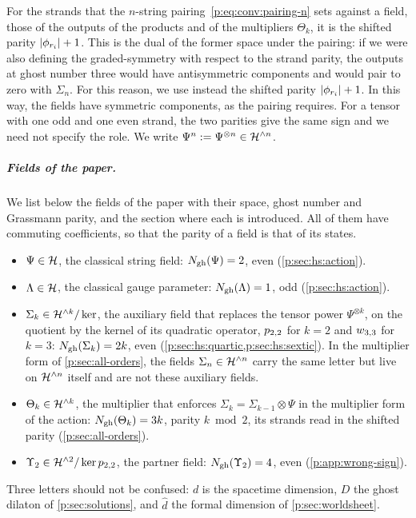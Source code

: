 For the strands that the $n$-string pairing~\eqref{p:eq:conv:pairing-n} sets against a field, those of the outputs of the products and of the multipliers $\Theta_k$, it is the shifted parity ${|\phi_{r_i}|} + 1$.
This is the dual of the former space under the pairing: if we were also defining the graded-symmetry with respect to the strand parity, the outputs at ghost number three would have antisymmetric components and would pair to zero with $\Sigma_n$.
For this reason, we use instead the shifted parity ${|\phi_{r_i}|} + 1$.
In this way, the fields have symmetric components, as the pairing requires.
For a tensor with one odd and one even strand, the two parities give the same sign and we need not specify the role.
We write $\Psi^n := \Psi^{\otimes n} \in \mathcal{H}^{\wedge n}$.


\subparagraph{Fields of the paper.}

We list below the fields of the paper with their space, ghost number and Grassmann parity, and the section where each is introduced.
All of them have commuting coefficients, so that the parity of a field is that of its states.
\begin{itemize}
  \item $\Psi \in \mathcal{H}$, the classical string field: $N_{\text{gh}}(\Psi) = 2$, even (\cref{p:sec:hs:action}).

  \item $\Lambda \in \mathcal{H}$, the classical gauge parameter: $N_{\text{gh}}(\Lambda) = 1$, odd (\cref{p:sec:hs:action}).

  \item $\Sigma_k \in \mathcal{H}^{\wedge k} / \ker$, the auxiliary field that replaces the tensor power $\Psi^{\otimes k}$, on the quotient by the kernel of its quadratic operator, $p_{2,2}$ for $k = 2$ and $w_{3,3}$ for $k = 3$: $N_{\text{gh}}(\Sigma_k) = 2 k$, even (\cref{p:sec:hs:quartic,p:sec:hs:sextic}).
    In the multiplier form of \cref{p:sec:all-orders}, the fields $\Sigma_n \in \mathcal{H}^{\wedge n}$ carry the same letter but live on $\mathcal{H}^{\wedge n}$ itself and are not these auxiliary fields.

  \item $\Theta_k \in \mathcal{H}^{\wedge k}$, the multiplier that enforces $\Sigma_k = \Sigma_{k-1} \otimes \Psi$ in the multiplier form of the action: $N_{\text{gh}}(\Theta_k) = 3 k$, parity $k \bmod 2$, its strands read in the shifted parity (\cref{p:sec:all-orders}).

  \item $\Upsilon_2 \in \mathcal{H}^{\wedge 2} / \ker p_{2,2}$, the partner field: $N_{\text{gh}}(\Upsilon_2) = 4$, even (\cref{p:app:wrong-sign}).
\end{itemize}
Three letters should not be confused: $d$ is the spacetime dimension, $D$ the ghost dilaton of \cref{p:sec:solutions}, and $\hat d$ the formal dimension of \cref{p:sec:worldsheet}.


